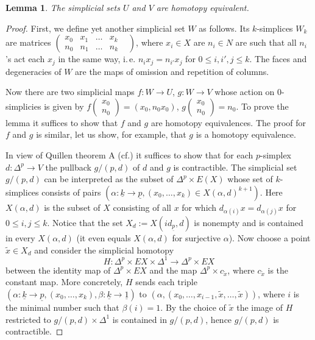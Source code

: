 \documentclass[oneside, 12pt]{amsart}
\theoremstyle{plain}
\numberwithin{equation}{section}
\newtheorem{lemma}{Lemma}
\numberwithin{lemma}{section}
\theoremstyle{remark}
\theoremstyle{definition}
\begin{document}
\begin{lemma} \label{lm:quillen-a} The simplicial sets $U$ and $V$ are homotopy equivalent. \end{lemma}
\begin{proof} First, we define yet another simplicial set $W$ as follows.
Its $k$-simplices $W_k$ are matrices $\left(\begin{smallmatrix}x_0 & x_1 & \ldots & x_k&\\ n_0 & n_1 & \ldots & n_k \end{smallmatrix}\right)$,
 where $x_i\in X$ are $n_i\in N$ are such that all $n_i$'s act each $x_j$ in the same way, i.\,e. $n_ix_j = n_{i'} x_j$ for $0\leq i,i',j\leq k$. 
 The faces and degeneracies of $W$ are the maps of omission and repetition of columns.
 
 Now there are two simplicial maps $f\colon W\to U$, $g\colon W\to V$ whose action on $0$-simplicies is given by 
  $f\left(\begin{smallmatrix}x_0 \\ n_0\end{smallmatrix}\right) = (x_0, n_0x_0)$, 
  $g\left(\begin{smallmatrix}x_0 \\ n_0\end{smallmatrix}\right) = n_0$. 
 To prove the lemma it suffices to show that $f$ and $g$ are homotopy equivalences. 
 The proof for $f$ and $g$ is similar, let us show, for example, that $g$ is a homotopy equivalence.
 
 In view of Quillen theorem A (cf.\cite[ex.~IV.3.11]{Kbook}) it suffices to show that for each $p$-simplex $d \colon \Delta^p \to V$ the 
  pullback $g/(p, d)$ of $d$ and $g$ is contractible.
 The simplicial set $g/(p, d)$ can be interpreted as the subset of $\Delta^p \times E(X)$ whose set of $k$-simplices consists of pairs
  $(\alpha\colon \underline{k}\to \underline{p}, (x_0, \ldots, x_k)\in X(\alpha, d)^{k+1})$.
 Here $X(\alpha, d)$ is the subset of $X$ consisting of all $x$ for which $d_{\alpha(i)}x = d_{\alpha(j)}x$ for $0\leq i,j\leq k$.
 Notice that the set $X_d := X(id_{\underline{p}}, d)$ is nonempty and is contained in every $X(\alpha, d)$ (it even equals $X(\alpha, d)$ for surjective $\alpha$).
 Now choose a point $\widetilde{x}\in X_d$ and consider the simplicial homotopy \[H\colon \Delta^p \times EX \times \Delta^1 \to \Delta^p\times EX\] 
  between the identity map of $\Delta^p \times EX$ and
 the map $\Delta^p \times c_{\widetilde{x}}$, where $c_{\widetilde{x}}$ is the constant map. 
 More concretely, $H$ sends each triple $(\alpha\colon \underline{k} \to \underline{p}, (x_0, \ldots, x_k), \beta\colon \underline{k}\to\underline{1})$
 to $(\alpha, (x_0, \ldots, x_{i-1}, \widetilde{x}, \ldots, \widetilde{x}))$, where $i$ is the minimal number such that $\beta(i)=1$.
 By the choice of $\widetilde{x}$ the image of $H$ restricted to $g/(p, d)\times \Delta^1$ is contained in $g/(p, d)$, hence $g/(p, d)$ is contractible. 
\end{proof}
\end{document}
